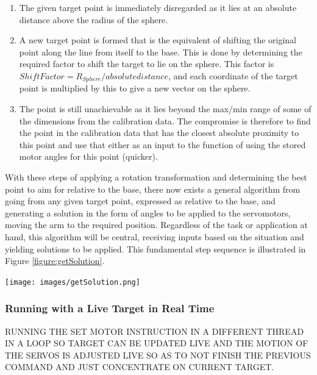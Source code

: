 \documentclass[11pt]{article}
\begin{document}
\begin{enumerate}
\item{The given target point is immediately disregarded as it lies at an absolute distance above the radius of the sphere.}
\item{A new target point is formed that is the equivalent of shifting the original point along the line from itself to the base. This is done by determining the required factor to shift the target to lie on the sphere. This factor is $Shift Factor = R_{Sphere} / absolute distance$, and each coordinate of the target point is multiplied by this to give a new vector on the sphere.}
\item{The point is still unachievable as it lies beyond the max/min range of some of the dimensions from the calibration data. The compromise is therefore to find the point in the calibration data that has the closest absolute proximity to this point and use that either as an input to the function of using the stored motor angles for this point (quicker). }
\end{enumerate}

With these steps of applying a rotation transformation and determining the best point to aim for relative to the base, there now exists a general algorithm from going from any given target point, expressed as relative to the base, and generating a solution in the form of angles to be applied to the servomotors, moving the arm to the required position. Regardless of the task or application at hand, this algorithm will be central, receiving inputs based on the situation and yielding solutions to be applied. This fundamental step sequence is illustrated in Figure \ref{figure:getSolution}.


\begin{center}
\texttt{[image: images/getSolution.png]}
\label{figure:getSolution}
\end{center}


\subsubsection{Running with a Live Target in Real Time}
RUNNING THE SET MOTOR INSTRUCTION IN A DIFFERENT THREAD IN A LOOP SO TARGET CAN BE UPDATED LIVE AND THE MOTION OF THE SERVOS IS ADJUSTED LIVE SO AS TO NOT FINISH THE PREVIOUS COMMAND AND JUST CONCENTRATE ON CURRENT TARGET.
\end{document}
